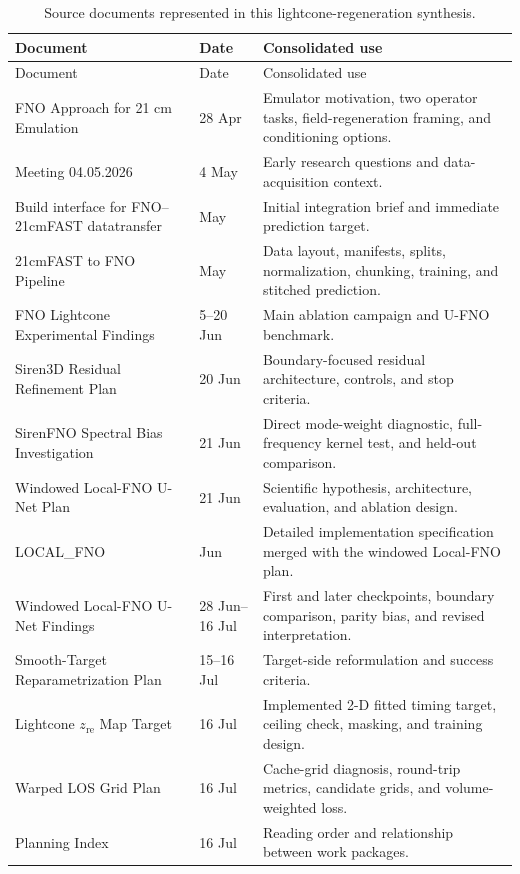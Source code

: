 \documentclass[11pt,a4paper]{article}
\newcommand{\zre}{z_{\mathrm{re}}}
\begin{document}
\begin{longtable}{@{}p{47mm}p{18mm}p{82mm}@{}}
\caption{Source documents represented in this lightcone-regeneration synthesis.}\\
\toprule
Document & Date & Consolidated use \\
\midrule
\endfirsthead
\toprule
Document & Date & Consolidated use \\
\midrule
\endhead
FNO Approach for 21 cm Emulation & 28 Apr & Emulator motivation, two operator
tasks, field-regeneration framing, and conditioning options. \\
Meeting 04.05.2026 & 4 May & Early research questions and data-acquisition
context. \\
Build interface for FNO--21cmFAST datatransfer & May & Initial integration
brief and immediate prediction target. \\
21cmFAST to FNO Pipeline & May & Data layout, manifests, splits,
normalization, chunking, training, and stitched prediction. \\
FNO Lightcone Experimental Findings & 5--20 Jun & Main ablation campaign and
U-FNO benchmark. \\
Siren3D Residual Refinement Plan & 20 Jun & Boundary-focused residual
architecture, controls, and stop criteria. \\
SirenFNO Spectral Bias Investigation & 21 Jun & Direct mode-weight diagnostic,
full-frequency kernel test, and held-out comparison. \\
Windowed Local-FNO U-Net Plan & 21 Jun & Scientific hypothesis, architecture,
evaluation, and ablation design. \\
LOCAL\_FNO & Jun & Detailed implementation specification merged with the
windowed Local-FNO plan. \\
Windowed Local-FNO U-Net Findings & 28 Jun--16 Jul & First and later
checkpoints, boundary comparison, parity bias, and revised interpretation. \\
Smooth-Target Reparametrization Plan & 15--16 Jul & Target-side reformulation
and success criteria. \\
Lightcone \(\zre\) Map Target & 16 Jul & Implemented 2-D fitted timing target,
ceiling check, masking, and training design. \\
Warped LOS Grid Plan & 16 Jul & Cache-grid diagnosis, round-trip metrics,
candidate grids, and volume-weighted loss. \\
Planning Index & 16 Jul & Reading order and relationship between work
packages. \\
\bottomrule
\end{longtable}
\end{document}
